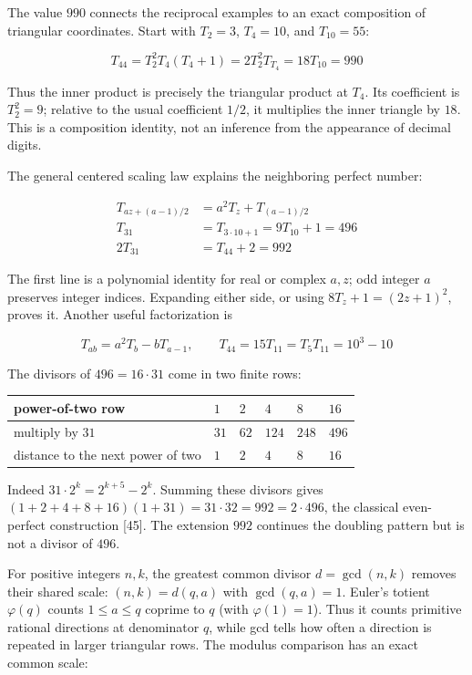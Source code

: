 \documentclass[
  11pt,
]{book}
\begin{document}
The value \(990\) connects the reciprocal examples to an exact
composition of triangular coordinates. Start with \(T_2=3\), \(T_4=10\),
and \(T_{10}=55\):

\[
\boxed{T_{44}=T_2^2T_4(T_4+1)
=2T_2^2T_{T_4}=18T_{10}=990}
\tag{NR.1}
\]

Thus the inner product is precisely the triangular product at \(T_4\).
Its coefficient is \(T_2^2=9\); relative to the usual coefficient
\(1/2\), it multiplies the inner triangle by \(18\). This is a
composition identity, not an inference from the appearance of decimal
digits.

The general centered scaling law explains the neighboring perfect
number:

\[
\begin{aligned}
T_{az+(a-1)/2}&=a^2T_z+T_{(a-1)/2}\\
T_{31}&=T_{3\cdot10+1}=9T_{10}+1=496\\
2T_{31}&=T_{44}+2=992
\end{aligned}
\tag{NR.2}
\]

The first line is a polynomial identity for real or complex \(a,z\); odd
integer \(a\) preserves integer indices. Expanding either side, or using
\(8T_z+1=(2z+1)^2\), proves it. Another useful factorization is

\[
T_{ab}=a^2T_b-bT_{a-1},\qquad
T_{44}=15T_{11}=T_5T_{11}=10^3-10
\tag{NR.3}
\]

The divisors of \(496=16\cdot31\) come in two finite rows:

\begin{longtable}[]{@{}llllll@{}}
\toprule\noalign{}
power-of-two row & \(1\) & \(2\) & \(4\) & \(8\) & \(16\) \\
\midrule\noalign{}
\endhead
\bottomrule\noalign{}
\endlastfoot
multiply by \(31\) & \(31\) & \(62\) & \(124\) & \(248\) & \(496\) \\
distance to the next power of two & \(1\) & \(2\) & \(4\) & \(8\) &
\(16\) \\
\end{longtable}

Indeed \(31\cdot2^k=2^{k+5}-2^k\). Summing these divisors gives
\((1+2+4+8+16)(1+31)=31\cdot32=992=2\cdot496\), the classical
even-perfect construction {[}45{]}. The extension \(992\) continues the
doubling pattern but is not a divisor of \(496\).

For positive integers \(n,k\), the greatest common divisor
\(d=\gcd(n,k)\) removes their shared scale: \((n,k)=d(q,a)\) with
\(\gcd(q,a)=1\). Euler's totient \(\varphi(q)\) counts \(1\le a\le q\)
coprime to \(q\) (with \(\varphi(1)=1\)). Thus it counts primitive
rational directions at denominator \(q\), while gcd tells how often a
direction is repeated in larger triangular rows. The modulus comparison
has an exact common scale:
\end{document}
